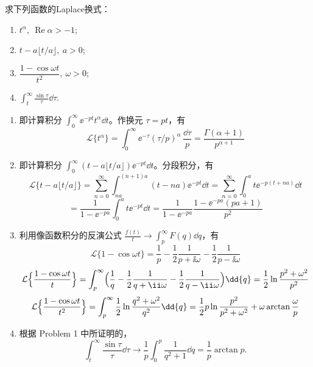 \begin{question}
\begin{solution}
\begin{center}
\end{center}
\end{solution}
\end{question}

\begin{question}
求下列函数的Laplace换式：
\begin{enumerate}
  \item \(t^\alpha,\ \operatorname{Re}\alpha >-1\);
  \item \(t-a\lfloor t/a\rfloor,\ a>0\);
  \item \(\dfrac{1-\cos\omega t}{t^2},\ \omega>0\);
  \item \(\displaystyle\int_t^\infty \frac{\sin\tau}{\tau}\dd{\tau}\).
\end{enumerate}
\begin{solution}

\begin{enumerate}
  \item 即计算积分 \(\displaystyle\int_0^\infty \ee^{-p t} t^{\alpha}\dd{t}\)。作换元 \(\tau = p t\)，有 \[ \mathcal{L}\{t^\alpha\}=\int_0^\infty \ee^{-\tau} (\tau/p)^{\alpha}\,\frac{\dd{\tau}}{p} = \frac{\Gamma(\alpha+1)}{p^{\alpha+1}} \]

  \item 即计算积分 \(\displaystyle\int_0^\infty (t-a\lfloor t/a\rfloor) \ee^{-p t}\dd{t}\)。分段积分，有 \[ \mathcal{L}\{t-a\lfloor t/a\rfloor\} = \sum_{n=0}^\infty \int_{n a}^{(n+1) a} (t-n a) \ee^{-p t}\dd{t} = \sum_{n=0}^\infty \int_0^a t \ee^{-p (t+n a)}\dd{t} \] \[ = \frac{1}{1-\ee^{-p a}} \int_0^a t \ee^{-p t}\dd{t} = \frac{1}{1-\ee^{-p a}}\frac{1-\ee^{-p a}(p a+1)}{p^2} \]

  \item 利用像函数积分的反演公式 \(\displaystyle\frac{f(t)}{t} \to \int_p^\infty F(q)\dd{q}\)，有 \[ \mathcal{L}\{1-\cos\omega t\}=\frac1p-\frac12\frac1{p+\ii\omega}-\frac12\frac1{p-\ii\omega} \] \[ \mathcal{L}\Bigl\{\frac{1-\cos\omega t}{t}\Bigr\} = \int_p^\infty \Bigl(\frac1q-\frac12\frac1{q+\ii\omega}-\frac12\frac1{q-\ii\omega}\Bigr)\dd{q} = \frac12\ln\frac{p^2+\omega^2}{p^2} \] \[ \mathcal{L}\Bigl\{\frac{1-\cos\omega t}{t^2}\Bigr\} = \int_p^\infty \frac12\ln\frac{q^2+\omega^2}{q^2}\dd{q} = \frac12 p\ln\frac{p^2}{p^2+\omega^2}+\omega\arctan\frac{\omega}{p} \]

  \item 根据 Problem 1 中所证明的，
  \[
  \int_t^\infty \frac{\sin\tau}{\tau}\dd{\tau}
  \longrightarrow
  \frac1p\int_0^p\frac{1}{q^2+1}\dd{q}
  =\frac1p\arctan p.
  \]
\end{enumerate}
\end{solution}
\end{question}

